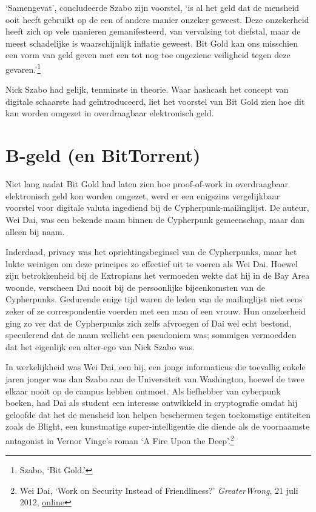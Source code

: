 \documentclass[smalldemyvopaper,11pt,twoside,onecolumn,openright,extrafontsizes,hidelinks]{memoir}
\begin{document}
`Samengevat', concludeerde Szabo zijn voorstel, `is al het geld dat de
mensheid ooit heeft gebruikt op de een of andere manier onzeker geweest.
Deze onzekerheid heeft zich op vele manieren gemanifesteerd, van
vervalsing tot diefstal, maar de meest schadelijke is waarschijnlijk
inflatie geweest. Bit Gold kan ons misschien een vorm van geld geven met
een tot nog toe ongeziene veiligheid tegen deze gevaren.'\footnote{Szabo,
  `Bit Gold.'}

Nick Szabo had gelijk, tenminste in theorie. Waar hashcash het concept
van digitale schaarste had geïntroduceerd, liet het voorstel van Bit
Gold zien hoe dit kan worden omgezet in overdraagbaar elektronisch geld.

\chapter{B-geld (en BitTorrent)}\label{b-geld-en-bittorrent}

Niet lang nadat Bit Gold had laten zien hoe proof-of-work in
overdraagbaar elektronisch geld kon worden omgezet, werd er een
enigszins vergelijkbaar voorstel voor digitale valuta ingediend bij de
Cypherpunk-mailinglijst. De auteur, Wei Dai, was een bekende naam binnen
de Cypherpunk gemeenschap, maar dan alleen bij naam.

Inderdaad, privacy was het oprichtingsbeginsel van de Cypherpunks, maar
het lukte weinigen om deze principes zo effectief uit te voeren als Wei
Dai. Hoewel zijn betrokkenheid bij de Extropians het vermoeden wekte dat
hij in de Bay Area woonde, verscheen Dai nooit bij de persoonlijke
bijeenkomsten van de Cypherpunks. Gedurende enige tijd waren de leden
van de mailinglijst niet eens zeker of ze correspondentie voerden met
een man of een vrouw. Hun onzekerheid ging zo ver dat de Cypherpunks
zich zelfs afvroegen of Dai wel echt bestond, speculerend dat de naam
wellicht een pseudoniem was; sommigen vermoedden dat het eigenlijk een
alter-ego van Nick Szabo was.

In werkelijkheid was Wei Dai, een hij, een jonge informaticus die
toevallig enkele jaren jonger was dan Szabo aan de Universiteit van
Washington, hoewel de twee elkaar nooit op de campus hebben ontmoet. Als
liefhebber van cyberpunk boeken, had Dai als student een interesse
ontwikkeld in cryptografie omdat hij geloofde dat het de mensheid kon
helpen beschermen tegen toekomstige entiteiten zoals de Blight, een
kunstmatige super-intelligentie die diende als de voornaamste antagonist
in Vernor Vinge's roman `A Fire Upon the Deep'.\footnote{Wei Dai, `Work
  on Security Instead of Friendliness?' \emph{GreaterWrong}, 21 juli
  2012,
  \href{https://www.greaterwrong.com/posts/m8FjhuELdg7iv6boW/work-on-security-instead-of-friendliness}{online}}
\end{document}
